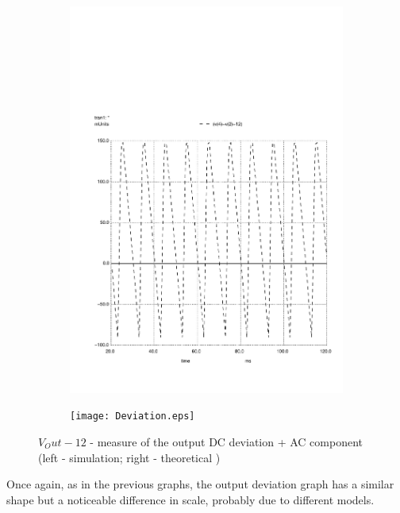 \begin{figure}[h]
    \centering
    \begin{subfigure}{0.23\textwidth}
        \includegraphics[width=\linewidth, clip]{solution12.pdf}
        \label{fig:output1}
    \end{subfigure}
    \begin{subfigure}{0.23\textwidth}
        \texttt{[image: Deviation.eps]}
        \label{fig:output2}
    \end{subfigure}
    \caption{\small $V_Out - 12$ - measure of the output DC deviation + AC component (left - simulation; right - theoretical )}
    \label{output_deviation}
\end{figure}

Once again, as in the previous graphs, the output deviation graph has a similar shape but a noticeable difference in scale, probably due to different models.


